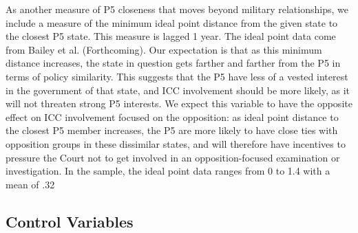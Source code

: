 As another measure of P5 closeness that moves beyond military relationships, we include a measure of the minimum ideal point distance from the given state to the closest P5 state.  This measure is lagged 1 year.  The ideal point data come from Bailey et al. (Forthcoming).  Our expectation is that as this minimum distance increases, the state in question gets farther and farther from the P5 in terms of policy similarity.  This suggests that the P5 have less of a vested interest in the government of that state, and ICC involvement should be more likely, as it will not threaten strong P5 interests.  We expect this variable to have the opposite effect on ICC involvement focused on the opposition: as ideal point distance to the closest P5 member increases, the P5 are more likely to have close ties with opposition groups in these dissimilar states, and will therefore have incentives to pressure the Court not to get involved in an opposition-focused examination or investigation.  In the sample, the ideal point data ranges from 0 to 1.4 with a mean of .32

\subsection*{Control Variables}

